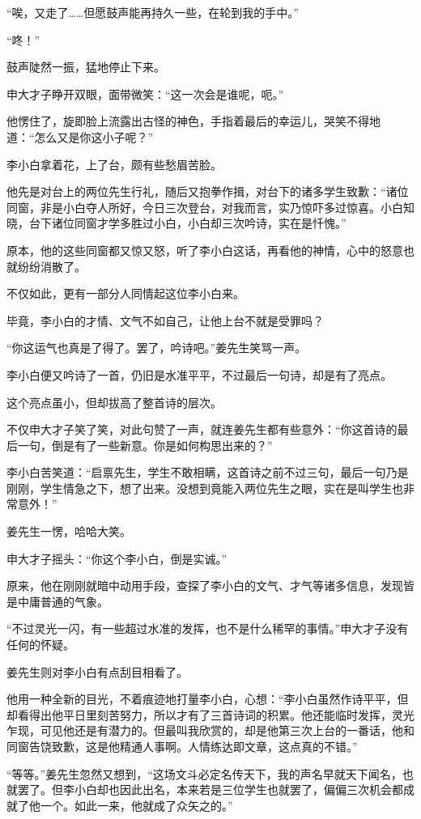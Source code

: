 \begin{this_body}
“唉，又走了……但愿鼓声能再持久一些，在轮到我的手中。”

“咚！”

鼓声陡然一振，猛地停止下来。

申大才子睁开双眼，面带微笑：“这一次会是谁呢，呃。”

他愣住了，旋即脸上流露出古怪的神色，手指着最后的幸运儿，哭笑不得地道：“怎么又是你这小子呢？”

李小白拿着花，上了台，颇有些愁眉苦脸。

他先是对台上的两位先生行礼，随后又抱拳作揖，对台下的诸多学生致歉：“诸位同窗，非是小白夺人所好，今日三次登台，对我而言，实乃惊吓多过惊喜。小白知晓，台下诸位同窗才学多胜过小白，小白却三次吟诗，实在是忏愧。”

原本，他的这些同窗都又惊又怒，听了李小白这话，再看他的神情，心中的怒意也就纷纷消散了。

不仅如此，更有一部分人同情起这位李小白来。

毕竟，李小白的才情、文气不如自己，让他上台不就是受罪吗？

“你这运气也真是了得了。罢了，吟诗吧。”姜先生笑骂一声。

李小白便又吟诗了一首，仍旧是水准平平，不过最后一句诗，却是有了亮点。

这个亮点虽小，但却拔高了整首诗的层次。

不仅申大才子笑了笑，对此句赞了一声，就连姜先生都有些意外：“你这首诗的最后一句，倒是有了一些新意。你是如何构思出来的？”

李小白苦笑道：“启禀先生，学生不敢相瞒，这首诗之前不过三句，最后一句乃是刚刚，学生情急之下，想了出来。没想到竟能入两位先生之眼，实在是叫学生也非常意外！”

姜先生一愣，哈哈大笑。

申大才子摇头：“你这个李小白，倒是实诚。”

原来，他在刚刚就暗中动用手段，查探了李小白的文气、才气等诸多信息，发现皆是中庸普通的气象。

“不过灵光一闪，有一些超过水准的发挥，也不是什么稀罕的事情。”申大才子没有任何的怀疑。

姜先生则对李小白有点刮目相看了。

他用一种全新的目光，不着痕迹地打量李小白，心想：“李小白虽然作诗平平，但却看得出他平日里刻苦努力，所以才有了三首诗词的积累。他还能临时发挥，灵光乍现，可见他还是有潜力的。但最叫我欣赏的，却是他第三次上台的一番话，他和同窗告饶致歉，这是他精通人事啊。人情练达即文章，这点真的不错。”

“等等。”姜先生忽然又想到，“这场文斗必定名传天下，我的声名早就天下闻名，也就罢了。但李小白却也因此出名，本来若是三位学生也就罢了，偏偏三次机会都成就了他一个。如此一来，他就成了众矢之的。”


\end{this_body}
